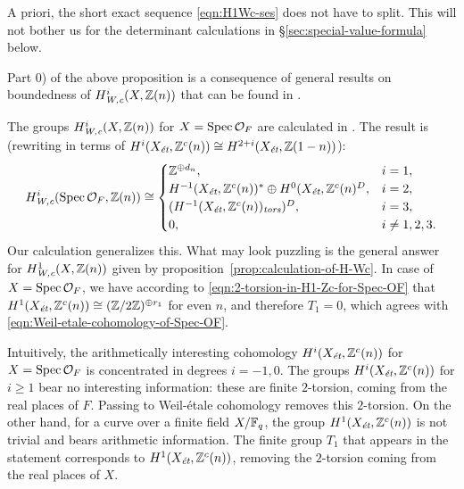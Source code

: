 \documentclass{article}
\numberwithin{equation}{section}
\begin{document}
\begin{remark}
  A priori, the short exact sequence \eqref{eqn:H1Wc-ses} does not have to
  split. This will not bother us for the determinant calculations in
  \S\ref{sec:special-value-formula} below.
\end{remark}

\begin{remark}
  Part 0) of the above proposition is a consequence of general results on
  boundedness of $H^i_\Wc (X,\ZZ(n))$ that can be found in
  \cite[\S 7]{Beshenov-Weil-etale-1}.
\end{remark}

\begin{remark}
  The groups $H^i_\Wc (X, \ZZ(n))$ for $X = \Spec \mathcal{O}_F$ are calculated
  in \cite[\S 5.8.3]{Flach-Morin-2018}. The result is (rewriting in terms of
  $H^i (X_\et, \ZZ^c(n)) \cong H^{2+i} (X_\et, \ZZ (1-n))$):
  \begin{equation}
    \label{eqn:Weil-etale-cohomology-of-Spec-OF}
    H^i_\Wc (\Spec \mathcal{O}_F, \ZZ(n)) \cong
    \begin{cases}
      \ZZ^{\oplus d_n}, & i = 1, \\
      H^{-1} (X_\et, \ZZ^c (n))^* \oplus H^0 (X_\et, \ZZ^c (n)^D, & i = 2, \\
      (H^{-1} (X_\et, \ZZ^c (n))_\tors)^D, & i = 3, \\
      0, & i \ne 1,2,3.
    \end{cases}
  \end{equation}
  Our calculation generalizes this. What may look puzzling is the general answer
  for $H^1_\Wc (X,\ZZ(n))$ given by
  proposition~\ref{prop:calculation-of-H-Wc}. In case of
  $X = \Spec \mathcal{O}_F$, we have according to
  \eqref{eqn:2-torsion-in-H1-Zc-for-Spec-OF} that
  $H^1 (X_\et, \ZZ^c(n)) \cong (\ZZ/2\ZZ)^{\oplus r_1}$ for even $n$, and
  therefore $T_1 = 0$, which agrees with
  \eqref{eqn:Weil-etale-cohomology-of-Spec-OF}.

  Intuitively, the arithmetically interesting cohomology $H^i (X_\et, \ZZ^c(n))$
  for $X = \Spec \mathcal{O}_F$ is concentrated in degrees $i = -1,0$. The
  groups $H^i (X_\et, \ZZ^c (n))$ for $i \ge 1$ bear no interesting information:
  these are finite $2$-torsion, coming from the real places of $F$. Passing to
  Weil-étale cohomology removes this $2$-torsion. On the other hand, for a curve
  over a finite field $X/\FF_q$, the group $H^1 (X_\et, \ZZ^c (n))$ is not
  trivial and bears arithmetic information. The finite group $T_1$ that appears
  in the statement corresponds to $H^1 (X_\et, \ZZ^c (n))$, removing the
  $2$-torsion coming from the real places of $X$.
\end{remark}
\end{document}
